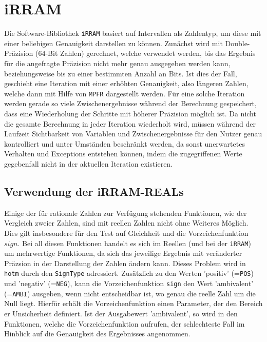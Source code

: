 \chapter{iRRAM}
Die Software-Bibliothek \verb+iRRAM+ \cite{Mller2009EnhancingIE} basiert auf Intervallen als Zahlentyp, um diese mit einer beliebigen Genauigkeit darstellen zu können. Zunächst wird mit Double-Präzision (64-Bit Zahlen) gerechnet, welche verwendet werden, bis das Ergebnis für die angefragte Präzision nicht mehr genau ausgegeben werden kann, beziehungsweise bis zu einer bestimmten Anzahl an Bits. Ist dies der Fall, geschieht eine Iteration mit einer erhöhten Genauigkeit, also längeren Zahlen, welche dann mit Hilfe von \verb+MPFR+ dargestellt werden.
Für eine solche Iteration werden gerade so viele Zwischenergebnisse während der Berechnung gespeichert, dass eine Wiederholung der Schritte mit höherer Präzision möglich ist. Da nicht die gesamte Berechnung in jeder Iteration wiederholt wird, müssen während der Laufzeit Sichtbarkeit von Variablen und Zwischenergebnisse für den Nutzer genau kontrolliert und unter Umständen beschränkt werden, da sonst unerwartetes Verhalten und Exceptions entstehen können, indem die zugegriffenen Werte gegebenfall nicht in der aktuellen Iteration existieren.

\section{Verwendung der iRRAM-REALs}
Einige der für rationale Zahlen zur Verfügung stehenden Funktionen, wie der Vergleich zweier Zahlen, sind mit reellen Zahlen nicht ohne Weiteres Möglich. Dies gilt insbesondere für den Test auf Gleichheit und die Vorzeichenfunktion $sign$. Bei all diesen Funktionen handelt es sich im Reellen (und bei der \verb+iRRAM+) um mehrwertige Funktionen, da sich das jeweilige Ergebnis mit veränderter Präzsion in der Darstellung der Zahlen ändern kann. Dieses Problem wird in \verb+hotm+ durch den \verb+SignType+ adressiert. Zusätzlich zu den Werten 'positiv' (=\verb+POS+) und 'negativ' (=\verb+NEG+),  kann die Vorzeichenfunktion \verb+sign+ den Wert 'ambivalent' (=\verb+AMBI+) ausgeben, wenn nicht entscheidbar ist, wo genau die reelle Zahl um die Null liegt. Hierfür erhält die Vorzeichenfunktion einen Parameter, der den Bereich er Unsicherheit definiert. Ist der Ausgabewert 'ambivalent', so wird in den Funktionen, welche die Vorzeichenfunktion aufrufen, der schlechteste Fall im Hinblick auf die Genauigkeit des Ergebnisses angenommen. 


